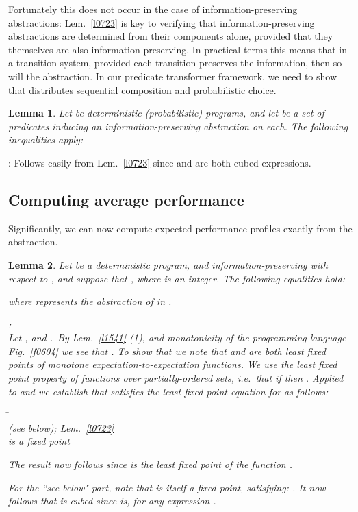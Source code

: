 \documentclass[numbers,copyright,creativecommons]{eptcs}
\newcommand{\figg}[1]{Fig.~\ref{#1}}
\newcommand{\Wp}{\mbox{\sf wp}}
\newcommand{\Prog}{\textit{Prog}}
\newcommand{\IE}{\textrm{i.e.}}
\newtheorem{Lems}{Lemma} \newcommand{\Lem}[1]{Lem.~\ref{#1}}
\newcommand{\Proof}{\noindent{\bf Proof}: \quad}
\newenvironment{Reason}{\begin{tabbing}\hspace{4em}\=\kill}{\end{tabbing}\vspace{-2.5ex}}
\newcommand{\Step}[2]{#1 \>  \\}
\newcommand{\StepR}[3]{#1 \>  \` {\RF #2} \\}
\newcommand{\RF}{\small}
\begin{document}
Fortunately this does not occur in the case of information-preserving abstractions: \Lem{l0723} is key to verifying that information-preserving abstractions are determined from their components alone, provided that they themselves are also information-preserving. In practical terms this means that in a transition-system, provided each transition preserves the information, then so will the abstraction. In our predicate transformer framework, we need to show that  distributes sequential composition and probabilistic choice.

\begin{Lems}\label{l1626}
Let  be deterministic (probabilistic) programs, and let  be a set of predicates inducing an information-preserving abstraction on each. The following inequalities apply:



\end{Lems}

\Proof
Follows easily from \Lem{l0723} since  and  are both cubed expressions.




\subsection{Computing average performance}

Significantly, we can now compute expected performance profiles exactly from the abstraction.



\begin{Lems}\label{l0939}
Let  be a deterministic program, and information-preserving with respect to , and suppose that , where  is an integer.
The following equalities hold:

where  represents the abstraction of  in .

\Proof\\
Let , and .\ By \Lem{l1541} (1), and monotonicity of the programming language \figg{f0604} we see that . To show that  we note that  and   are both least fixed points of monotone expectation-to-expectation functions. We use the least fixed point property of functions over partially-ordered sets, \IE\ that if  then  \cite{Tarski}. Applied to  and  we establish that  satisfies the least fixed point equation for  as follows:

\begin{Reason}
\Step{}
{[G]{\times}[n\leq k] + [\neg G]{\times} \Wp_\Phi.\Prog.N}
\StepR{}{ (see below);  \Lem{l0723}}
{[G]{\times}[n\leq k] + [\neg G]{\times} \Wp.\Prog.N_\Phi}
\StepR{}{ is a fixed point}
{N_\Phi~.}
\end{Reason}
The result now follows since  is the least fixed point of the function .

For the ``see below" part, note that  is itself a fixed point, satisfying: . It now follows that  is cubed since   is, for any expression .
\end{Lems}
\end{document}
